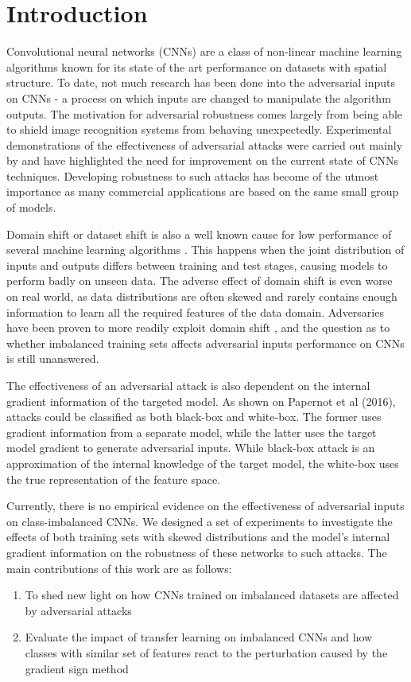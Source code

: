 \documentclass[runningheads,a4paper]{llncs}
\begin{document}
\section{Introduction}


Convolutional neural networks (CNNs) are a class of non-linear machine learning algorithms known for its state of the art performance on datasets with spatial structure. To date, not much research has been done into the adversarial inputs on CNNs - a process on which inputs are changed to manipulate the algorithm outputs. The motivation for adversarial robustness comes largely from being able to shield image recognition systems from behaving unexpectedly. Experimental demonstrations of the effectiveness of adversarial attacks were carried out mainly by \cite{billovits,goodfellow2014,papernot2016} and have highlighted the need for improvement on the current state of CNNs techniques. Developing robustness to such attacks has become of the utmost importance as many commercial applications are based on the same small group of models.

Domain shift or dataset shift \cite{Quionero} is also a well known cause for low performance of several machine learning algorithms \cite{japkowicz2002class,krawczyk2016learning}. This happens when the joint distribution of inputs and outputs differs between training and test stages, causing models to perform badly on unseen data. The adverse effect of domain shift is even worse on real world, as data distributions are often skewed and rarely contains enough information to learn all the required features of the data domain. Adversaries have been proven to more readily exploit domain shift \cite{Laskov2010,lowd2005}, and the question as to whether imbalanced training sets affects adversarial inputs performance on CNNs is still unanswered. 

The effectiveness of an adversarial attack is also dependent on the internal gradient information of the targeted model. As shown on Papernot et al (2016), attacks could be classified as both black-box and white-box. The former uses gradient information from a separate model, while the latter uses the target model gradient to generate adversarial inputs. While black-box attack is an approximation of the internal knowledge of the target model, the white-box uses the true representation of the feature space.

Currently, there is no empirical evidence on the effectiveness of adversarial inputs on class-imbalanced CNNs. We designed a set of experiments to investigate the effects of both training sets with skewed distributions and the model's internal gradient information on the robustness of these networks to such attacks. The main contributions of this work are as follows: 
\begin{enumerate}
	\item To shed new light on how CNNs trained on imbalanced datasets are affected by adversarial attacks
	\item Evaluate the impact of transfer learning on imbalanced CNNs and how classes with similar set of features react to the perturbation caused by the gradient sign method
\end{enumerate}
\end{document}
